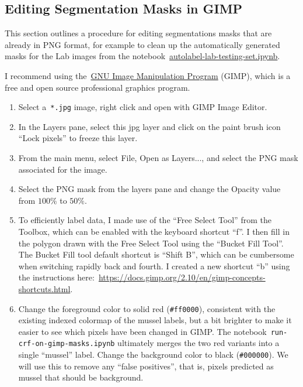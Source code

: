 \documentclass[11pt]{article} %
\begin{document}
\subsection{Editing Segmentation Masks in GIMP}

This section outlines a procedure for editing segmentations masks that are 
already in PNG format, for example to clean up the automatically generated 
masks for the Lab images from the
notebook~\href{https://github.com/AngusG/cciw-zebra-mussel/blob/master/labelme/autolabel-lab-testing-set.ipynb}{autolabel-lab-testing-set.ipynb}.

I recommend using the~\href{https://www.gimp.org/}{GNU Image Manipulation
Program} (GIMP), which is a free and open source professional graphics program.

\begin{enumerate}
\item Select a~\texttt{*.jpg} image, right click and open with GIMP Image 
Editor.
\item In the Layers pane, select this jpg layer and click on the paint brush 
icon ``Lock pixels'' to freeze this layer.
\item From the main menu, select File, Open as Layers..., and select the PNG 
mask associated for the image.
\item Select the PNG mask from the layers pane and change the Opacity value
from $100\%$ to $50\%$.

\item To efficiently label data, I made use of the ``Free Select Tool'' from
the Toolbox, which can be enabled with the keyboard shortcut ``f''. I then fill
in the polygon drawn with the Free Select Tool using the ``Bucket Fill Tool''. 
The Bucket Fill tool default shortcut is ``Shift B'', which can be cumbersome 
when switching rapidly back and fourth. I created a new shortcut ``b'' using 
the instructions 
here:~\url{https://docs.gimp.org/2.10/en/gimp-concepts-shortcuts.html}.

\item Change the foreground color to solid red (\texttt{\#ff0000}), consistent
with the existing indexed colormap of the mussel labels, but a bit brighter to
make it easier to see which pixels have been changed in GIMP. The
notebook~\texttt{run-crf-on-gimp-masks.ipynb} ultimately merges the two red
variants into a single ``mussel'' label. Change the background color to 
black (\texttt{\#000000}). We will use this to remove any ``false positives'', 
that is, pixels predicted as mussel that should be background.


\end{enumerate}
\end{document}
